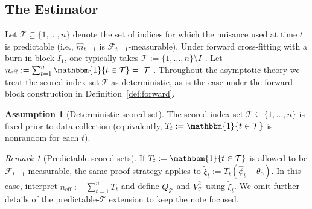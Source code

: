 \documentclass[11pt]{article}
\numberwithin{equation}{section}
\theoremstyle{plain}
\theoremstyle{definition}
\newtheorem{assumption}[theorem]{Assumption}
\theoremstyle{remark}
\newtheorem{remark}[theorem]{Remark}
\newcommand{\ind}[1]{\mathbbm{1}\{#1\}}
\newcommand{\cF}{\mathcal{F}}
\begin{document}
\subsection{The Estimator}\label{sec:estimator}

Let $\mathcal{T}\subseteq\{1,\dots,n\}$ denote the set of indices for which the nuisance used at time $t$ is predictable (i.e., $\widehat m_{t-1}$ is $\cF_{t-1}$-measurable).
Under forward cross-fitting with a burn-in block $I_1$, one typically takes $\mathcal{T}:=\{1,\dots,n\}\setminus I_1$.
Let $n_{\mathrm{eff}}:=\sum_{t=1}^n \ind{t\in\mathcal{T}}=|\mathcal{T}|$. Throughout the asymptotic theory we treat the scored index set $\mathcal{T}$ as
deterministic, as is the case under the
forward-block construction in Definition~\ref{def:forward}.

\begin{assumption}[Deterministic scored set]\label{ass:T_det}
The scored index set $\mathcal{T}\subseteq\{1,\dots,n\}$ is fixed prior to data collection (equivalently, $T_t:=\ind{t\in\mathcal{T}}$ is nonrandom for each $t$).
\end{assumption}

\begin{remark}[Predictable scored sets]\label{rem:T_predictable}
If $T_t:=\ind{t\in\mathcal{T}}$ is allowed to be $\cF_{t-1}$-measurable, the same proof strategy applies to $\tilde\xi_t:=T_t(\widehat\phi_t-\theta_0)$. In this case, interpret $n_{\mathrm{eff}}:=\sum_{t=1}^n T_t$ and define $Q_{\mathcal{T}}$ and $V_{\mathcal{T}}^2$ using $\tilde\xi_t$. We omit further details of the predictable-$\mathcal{T}$ extension to keep the note focused.
\end{remark}
\end{document}
